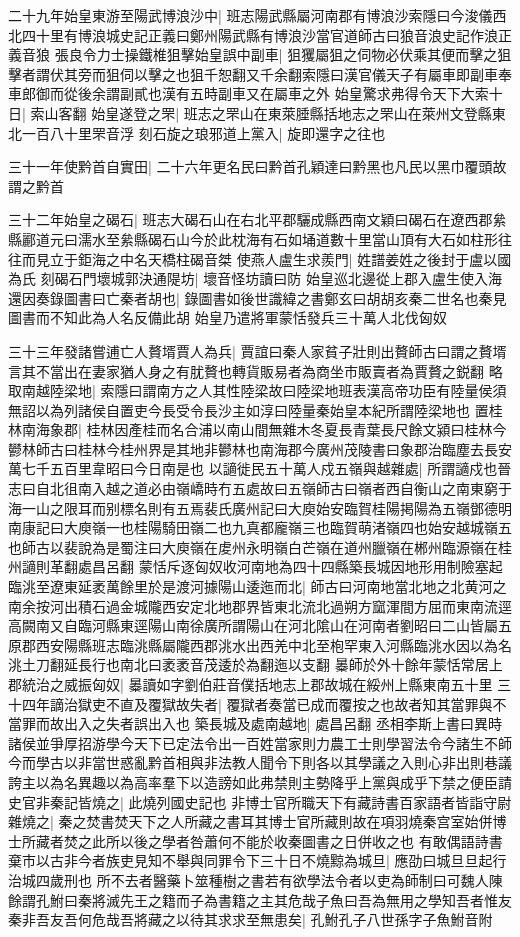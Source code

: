 二十九年始皇東游至陽武博浪沙中|{
	班志陽武縣屬河南郡有博浪沙索隱曰今浚儀西北四十里有博浪城史記正義曰鄭州陽武縣有博浪沙當官道師古曰狼音浪史記作浪正義音狼}
張良令力士操鐵椎狙擊始皇誤中副車|{
	狙玃屬狙之伺物必伏乘其便而擊之狙擊者謂伏其旁而狙伺以擊之也狙千恕翻又千余翻索隱曰漢官儀天子有屬車即副車奉車郎御而從後余謂副貳也漢有五時副車又在屬車之外}
始皇驚求弗得令天下大索十日|{
	索山客翻}
始皇遂登之罘|{
	班志之罘山在東萊腄縣括地志之罘山在萊州文登縣東北一百八十里罘音浮}
刻石旋之琅邪道上黨入|{
	旋即還字之往也}


三十一年使黔首自實田|{
	二十六年更名民曰黔首孔穎達曰黔黑也凡民以黑巾覆頭故謂之黔首}


三十二年始皇之碣石|{
	班志大碣石山在右北平郡驪成縣西南文穎曰碣石在遼西郡絫縣酈道元曰濡水至絫縣碣石山今於此枕海有石如埇道數十里當山頂有大石如柱形往往而見立于鉅海之中名天橋柱碣音桀}
使燕人盧生求羨門|{
	姓譜姜姓之後封于盧以國為氏}
刻碣石門壞城郭決通隄坊|{
	壞音怪坊讀曰防}
始皇巡北邊從上郡入盧生使入海還因奏錄圖書曰亡秦者胡也|{
	錄圖書如後世識緯之書鄭玄曰胡胡亥秦二世名也秦見圖書而不知此為人名反備此胡}
始皇乃遣將軍蒙恬發兵三十萬人北伐匈奴

三十三年發諸嘗逋亡人贅壻賈人為兵|{
	賈誼曰秦人家貧子壯則出贅師古曰謂之贅壻言其不當出在妻家猶人身之有肬贅也轉貨販易者為商坐市販賣者為賈贅之鋭翻}
略取南越陸梁地|{
	索隱曰謂南方之人其性陸梁故曰陸梁地班表漢高帝功臣有陸量侯須無詔以為列諸侯自置吏今長受令長沙主如淳曰陸量秦始皇本紀所謂陸梁地也}
置桂林南海象郡|{
	桂林因產桂而名合浦以南山間無雜木冬夏長青葉長尺餘文潁曰桂林今鬰林師古曰桂林今桂州界是其地非鬰林也南海郡今廣州茂陵書曰象郡治臨塵去長安萬七千五百里韋昭曰今日南是也}
以讁徙民五十萬人戍五嶺與越雜處|{
	所謂讁戍也晉志曰自北徂南入越之道必由嶺嶠時冇五處故曰五嶺師古曰嶺者西自衡山之南東窮于海一山之限耳而别標名則有五焉裴氏廣州記曰大庾始安臨賀桂陽掲陽為五嶺鄧德明南康記曰大庾嶺一也桂陽騎田嶺二也九真都龐嶺三也臨賀萌渚嶺四也始安越城嶺五也師古以裴說為是蜀注曰大庾嶺在䖍州永明嶺白芒嶺在道州臘嶺在郴州臨源嶺在桂州讁則革翻處昌呂翻}
蒙恬斥逐匈奴收河南地為四十四縣築長城因地形用制險塞起臨洮至遼東延袤萬餘里於是渡河據陽山逶迤而北|{
	師古曰河南地當北地之北黄河之南余按河出積石過金城隴西安定北地郡界皆東北流北過朔方窳渾間方屈而東南流逕高闕南又自臨河縣東逕陽山南徐廣所謂陽山在河北隂山在河南者劉昭曰二山皆屬五原郡西安陽縣班志臨洮縣屬隴西郡洮水出西羌中北至枹罕東入河縣臨洮水因以為名洮土刀翻延長行也南北曰袤袤音茂逶於為翻迤以支翻}
㬥師於外十餘年蒙恬常居上郡統治之威振匈奴|{
	㬥讀如字劉伯莊音僕括地志上郡故城在綏州上縣東南五十里}
三十四年謫治獄吏不直及覆獄故失者|{
	覆獄者奏當已成而覆按之也故者知其當罪與不當罪而故出入之失者誤出入也}
築長城及處南越地|{
	處昌呂翻}
丞相李斯上書曰異時諸侯並爭厚招游學今天下已定法令出一百姓當家則力農工士則學習法令今諸生不師今而學古以非當世惑亂黔首相與非法教人聞令下則各以其學議之入則心非出則巷議誇主以為名異趣以為高率羣下以造謗如此弗禁則主勢降乎上黨與成乎下禁之便臣請史官非秦記皆燒之|{
	此燒列國史記也}
非博士官所職天下有藏詩書百家語者皆詣守尉雜燒之|{
	秦之焚書焚天下之人所藏之書耳其博士官所藏則故在項羽燒秦宫室始併博士所藏者焚之此所以後之學者咎蕭何不能於收秦圖書之日併收之也}
有敢偶語詩書棄市以古非今者族吏見知不舉與同罪令下三十日不燒黥為城旦|{
	應劭曰城旦旦起行治城四歲刑也}
所不去者醫藥卜筮種樹之書若有欲學法令者以吏為師制曰可魏人陳餘謂孔鮒曰秦將滅先王之籍而子為書籍之主其危哉子魚曰吾為無用之學知吾者惟友秦非吾友吾何危哉吾將藏之以待其求求至無患矣|{
	孔鮒孔子八世孫字子魚鮒音附}



